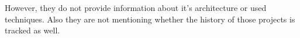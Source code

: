 However, they do not provide information about it's architecture or used techniques.
Also they are not mentioning whether the history of those projects is tracked as well.

